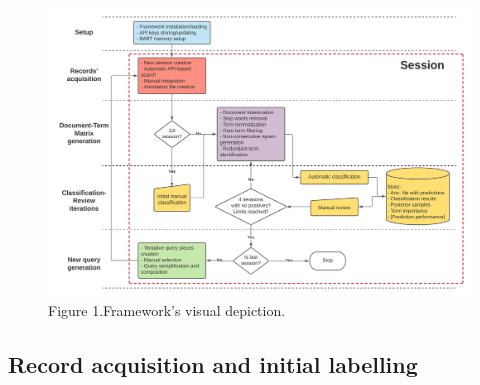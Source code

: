 \documentclass{article}
\begin{document}
\begin{figure}
\includegraphics[width=1\linewidth]{methods_diagram} \caption{Figure 1.Framework's visual depiction.}\label{fig:method_diagram}
\end{figure}

\hypertarget{record-acquisition-and-initial-labelling}{%
\subsection{Record acquisition and initial
labelling}\label{record-acquisition-and-initial-labelling}}
\end{document}
